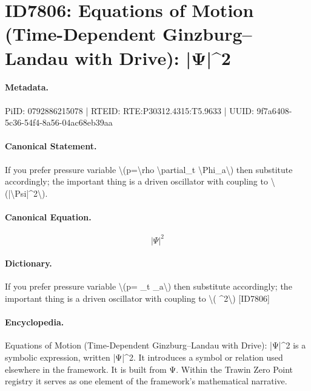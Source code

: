 \section*{ID7806: Equations of Motion (Time-Dependent Ginzburg–Landau with Drive): |Ψ|\textasciicircum{}2}
\paragraph{Metadata.}
PiID: 0792886215078 | RTEID: RTE:P30312.4315:T5.9633 | UUID: 9f7a6408-5c36-54f4-8a56-04ac68eb39aa

\paragraph{Canonical Statement.}
If you prefer pressure variable \textbackslash{}(p=\textbackslash{}rho \textbackslash{}partial\_t \textbackslash{}Phi\_a\textbackslash{}) then substitute accordingly; the important thing is a driven oscillator with coupling to \textbackslash{}(|\textbackslash{}Psi|\textasciicircum{}2\textbackslash{}).

\paragraph{Canonical Equation.}
\[
|\Psi|^2
\]

\paragraph{Dictionary.}
If you prefer pressure variable \textbackslash{}(p= \_t \_a\textbackslash{}) then substitute accordingly; the important thing is a driven oscillator with coupling to \textbackslash{}( \textasciicircum{}2\textbackslash{}) [ID7806]

\paragraph{Encyclopedia.}
Equations of Motion (Time-Dependent Ginzburg–Landau with Drive): |Ψ|\textasciicircum{}2 is a symbolic expression, written |Ψ|\textasciicircum{}2. It introduces a symbol or relation used elsewhere in the framework. It is built from Ψ. Within the Trawin Zero Point registry it serves as one element of the framework's mathematical narrative.
